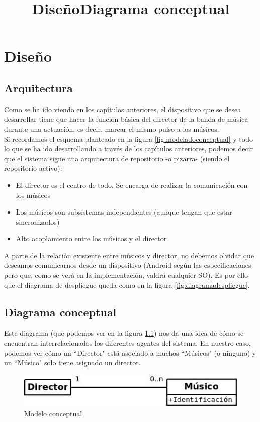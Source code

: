 \chapter{Diseño}
\title{Diseño}
\label{cap:Diseno}

\section{Arquitectura}
Como se ha ido viendo en los capítulos anteriores, el dispositivo que se desea desarrollar
tiene que hacer la función básica del director de la banda de música durante una actuación,
es decir, marcar el mismo pulso a los músicos.\\

Si recordamos el esquema planteado en la figura \ref{fig:modeladoconceptual} y todo lo
que se ha ido desarrollando a través de los capítulos anteriores, podemos decir
que el sistema sigue una arquitectura de repositorio -o pizarra- (siendo el repositorio activo):

\begin{itemize}
  \item El director es el centro de todo. Se encarga de realizar la comunicación con los músicos
  \item Los músicos son subsistemas independientes (aunque tengan que estar sincronizados)
  \item Alto acoplamiento entre los músicos y el director
\end{itemize}

A parte de la relación existente entre músicos y director, no debemos olvidar que
deseamos comunicarnos desde un dispositivo (Android según las especificaciones pero que,
como se verá en la implementación, valdrá cualquier SO). Es por ello que el diagrama
de despliegue queda como en la figura \ref{fig:diagramadespliegue}.\\

\section{Diagrama conceptual}
\title{Diagrama conceptual}
Este diagrama (que podemos ver en la figura \ref{fig:modeloconceptual})
nos da una idea de cómo se encuentran interrelacionados los diferentes
agentes del sistema. En nuestro caso, podemos ver cómo un ``Director" está asociado
a muchos ``Músicos" (o ninguno) y un ``Músico" solo tiene asignado un director.\\


\begin{figure}[!htb]
\centering
\includegraphics[width=1\textwidth]{./imagenes/modeloconceptual}
\caption{Modelo conceptual} \label{fig:modeloconceptual}
\end{figure}

